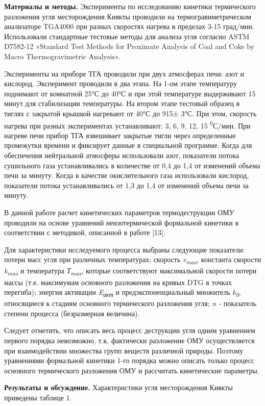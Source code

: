 \begin{multicols}{2}
{\bfseries Материалы и методы.} Эксперименты по исследованию кинетики
термического разложения угля месторождения Киякты проводили на
термогравиметрическом анализаторе TGA4000 при разных скоростях нагрева в
пределах 3-15 град/мин. Использовали стандартные тестовые методы для
анализа угля согласно ASTM D7582-12 «Standard Test Methods for Proximate
Analysis of Coal and Coke by Macro Thermogravimetric Analysis».

Эксперименты на приборе ТГА проводили при двух атмосферах печи: азот и
кислород. Эксперимент проводили в два этапа. На 1-ом этапе температуру
поднимают от комнатной 25°С до 40°С и при этой температуре выдерживают
15 минут для стабилизации температуры. На втором этапе тестовый образец
в тиглях с закрытой крышкой нагревают от 40°С до 915± 3°С. При этом,
скорость нагрева при разных экспериментах устанавливают: 3, 6, 9, 12, 15
\textsuperscript{0}С/мин. При нагреве печи прибор ТГА взвешивает
закрытые тигли через определенные промежутки времени и фиксирует данные
в специальной программе. Когда для обеспечения нейтральной атмосферы
использовали азот, показатели потока сушильного газа устанавливались в
количестве от 0,4 до 1,4 от изменений объема печи за минуту. Когда в
качестве окислительного газа использовали кислород, показатели потока
устанавливались от 1,3 до 1,4 от изменений объема печи за минуту.

В данной работе расчет кинетических параметров термодеструкции ОМУ
проводили на основе уравнений неизотермической формальной кинетики в
соответствии с методикой, описанной в работе {[}13{]}.

Для характеристики исследуемого процесса выбраны следующие показатели:
потери масс угля при различных температурах; скорость
\emph{v\textsubscript{max}}, константа скорости
\emph{k\textsubscript{max}} и температура \emph{Т\textsubscript{max}},
которые соответствуют максимальной скорости потери массы (т.е.
максимумам основного разложения на кривых DTG в точках перегиба);
энергия активации \emph{E\textsubscript{акт }}и предэкспоненциальный
множитель \emph{k\textsubscript{0}}, относящиеся к стадиям основного
термического разложения угля; \emph{n -} показатель степени процесса
(безразмерная величина).

Следует отметить, что описать весь процесс деструкции угля одним
уравнением первого порядка невозможно, т.к. фактически разложение ОМУ
осуществляется при взаимодействии множества групп веществ различной
природы. Поэтому уравнениями формальной кинетики 1-го порядка можно
описать только процесс основного термического разложения ОМУ и
рассчитать кинетические параметры.

{\bfseries Результаты и обсуждение.} Характеристики угля месторождения
Киякты приведены таблице 1.
\end{multicols}

